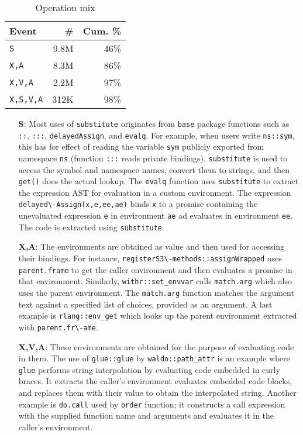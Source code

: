 \documentclass[10pt,review,sigplan,authorversion=true]{acmart}
\newcommand{\code}[1]{\lstinline |#1|\xspace}
\renewcommand{\c}[1]{\lstinline |#1|\xspace}
\newcommand{\base}{\code{base}}
\newcommand{\substitute}{\code{substitute}}
\begin{document}
\begin{table}[!h]  \small
  \caption{Operation mix} \label{table:call_env_seq}  \centering
  \begin{tabular}{lrr}    \toprule
    \textbf{Event}&\textbf{\#}&\textbf{Cum. \%}\\\midrule
    \texttt{S}&          9.8M & 46\%\\
    \texttt{X,A}&        8.3M & 86\%\\
    \texttt{X,V,A}&      2.2M & 97\%\\
    \texttt{X,S,V,A}   & 312K & 98\%\\\bottomrule
  \end{tabular}
\end{table}

\begin{itemize}
\item[{\bf S}:] Most uses of \c{substitute} originates from \base package
  functions such as \c{::}, \c{:::}, \c{delayedAssign}, and \c{evalq}. For
  example, when users write \c{ns::sym}, this has for effect of reading the
  variable \c{sym} publicly exported from namespace \c{ns} (function \c{:::}
  reads private bindings). \substitute is used to access the symbol and
  namespace names, convert them to strings, and then \c{get()} does the actual
  lookup. The \c{evalq} function uses \substitute to extract the expression AST
  for evaluation in a custom environment. The expression
  \c{delayed\-Assign(x,e,ee,ae)} binds \c{x} to a promise containing the
  unevaluated expression \c{e} in environment \c{ae} ad evaluates in environment
  \c{ee}. The code is extracted using \c{substitute}.

\item[{\bf X,A}:] The environments are obtained as value and then used for
  accessing their bindings. For instance, \c{registerS3\-methods::assignWrapped}
  uses \c{parent.frame} to get the caller environment and then evaluates a
  promise in that environment. Similarly, \c{withr::set_envvar} calls
  \c{match.arg} which also uses the parent environment. The \c{match.arg}
  function matches the argument text against a specified list of choices,
  provided as an argument. A last example is \c{rlang::env_get} which looks up
  the parent environment extracted with \c{parent.fr\-ame}.

\item[{\bf X,V,A}:] These environments are obtained for the purpose of
  evaluating code in them. The use of \c{glue::glue} by \c{waldo::path_attr} is
  an example where \c{glue} performs string interpolation by evaluating code
  embedded in curly braces. It extracts the caller's environment evaluates
  embedded code blocks, and replaces them with their value to obtain the
  interpolated string. Another example is \c{do.call} used by \c{order}
  function; it constructs a call expression with the supplied function name and
  arguments and evaluates it in the caller's environment.


\end{itemize}
\end{document}
